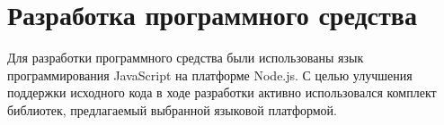 \section{Разработка программного средства}
\label{sec:func}

Для разработки программного средства были использованы язык программирования JavaScript на платформе Node.js.
С целью улучшения поддержки исходного кода в ходе разработки активно использовался комплект библиотек,
предлагаемый выбранной языковой платформой.


